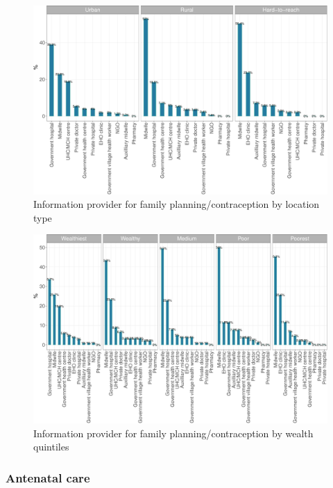 \documentclass[12pt,a4paper]{article}
\begin{document}
\begin{figure}[H]

{\centering \includegraphics{kayahReport_files/figure-latex/fplan5plot-1} 

}

\caption{Information provider for family planning/contraception by location type}\label{fig:fplan5plot}
\end{figure}

\begin{figure}[H]

{\centering \includegraphics{kayahReport_files/figure-latex/fplan6plot-1} 

}

\caption{Information provider for family planning/contraception by wealth quintiles}\label{fig:fplan6plot}
\end{figure}

\hypertarget{anc}{%
\subsubsection{Antenatal care}\label{anc}}
\end{document}
